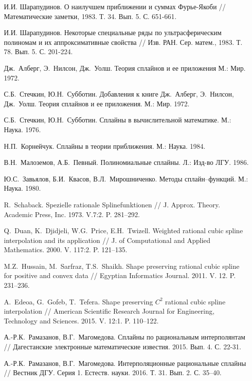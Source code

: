 \begin{thebibliography}{999}
 И.И. Шарапудинов. О наилучшем приближении и суммах Фурье-Якоби // Математические заметки, 1983. Т. 34. Вып. 5. С. 651-661.

 И.И. Шарапудинов. Некоторые специальные ряды по ультрасферическим полиномам и их аппроксимативные свойства // Изв. РАН. Сер. матем., 1983. Т. 78. Вып. 5. С. 201-224.

  Дж.~Алберг, Э.~Нилсон, Дж.~Уолш. Теория сплайнов и ее приложения  М.: Мир. 1972.


  С.Б.~Стечкин, Ю.Н.~Субботин. Добавления к книге Дж.~Алберг, Э.~Нилсон, Дж.~Уолш.
 Теория сплайнов и ее приложения.  М.: Мир. 1972.


 С.Б.~Стечкин, Ю.Н.~Субботин.  Сплайны в вычислительной математике. М.:  Наука. 1976.


  Н.П.~Корнейчук.  Сплайны в теории приближения. М.:  Наука. 1984.



  В.Н.~Малоземов, А.Б.~Певный. Полиномиальные сплайны. Л.: Изд-во ЛГУ. 1986.


 Ю.С.~Завьялов, Б.И.~Квасов, В.Л.~Мирошниченко.  Методы сплайн--функций.  М.: Наука. 1980.



 R.~Schaback.  Spezielle rationale Splinefunktionen //  J. Approx. Theory. Academic Press, Inc. 1973. V.7:2.
P. 281--292.


  Q.~Duan, K.~Djidjeli, W.G.~Price, E.H.~Twizell.  Weighted rational  cubic spline interpolation
 and its application // J. of Computational  and Applied Mathematics. 2000. V. 117:2. P. 121--135.


  M.Z.~Hussain, M.~Sarfraz, T.S.~Shaikh.  Shape preserving rational cubic spline for positive
and convex data //  Egyptian Informatics Journal. 2011. V.  12. P. 231--236.


  A.~Edeoa, G.~Gofeb, T.~Tefera.  Shape preserving $C^2$ rational cubic spline interpolation //
 American Scientific Research Journal for Engineering, Technology and Sciences. 2015. V. 12:1. P. 110--122.


 А.-Р.К.~Рамазанов, В.Г.~Магомедова. Сплайны по рациональным интерполянтам // Дагестанские
электронные математические известия. 2015. Вып. 4. С. 22-31.


 А.-Р.К.~Рамазанов, В.Г.~Магомедова. Интерполяционные рациональные сплайны // Вестник ДГУ. Серия 1. Естеств. науки. 2016.
Т. 31. Вып. 2. С. 35--40.



\end{thebibliography}

